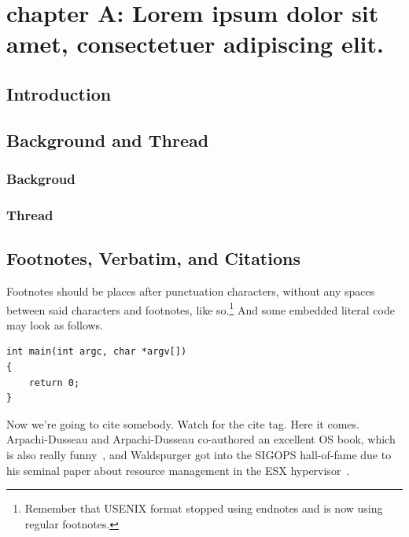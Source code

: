 \chapter{chapter A: Lorem ipsum dolor sit amet, consectetuer adipiscing elit.}
\lipsum[1]

\section{Introduction}
\lipsum[2-3]

\section{Background and Thread}
\lipsum[4-5]

\subsection{Backgroud}
\lipsum[6-7]

\subsection{Thread}
\lipsum[6-7]

\section{Footnotes, Verbatim, and Citations}

Footnotes should be places after punctuation characters, without any spaces between said characters and footnotes, like so.\footnote{Remember that USENIX format stopped using endnotes and is now using regular footnotes.} And some embedded literal code may look as follows.\par

\begin{verbatim}
int main(int argc, char *argv[]) 
{
    return 0;
}
\end{verbatim}

Now we're going to cite somebody. Watch for the cite tag. Here it comes. Arpachi-Dusseau and Arpachi-Dusseau co-authored an excellent OS book, which is also really funny~\cite{arpachiDusseau18:osbook}, and Waldspurger got into the SIGOPS hall-of-fame due to his seminal paper about resource management in the ESX hypervisor~\cite{waldspurger02}.\par


